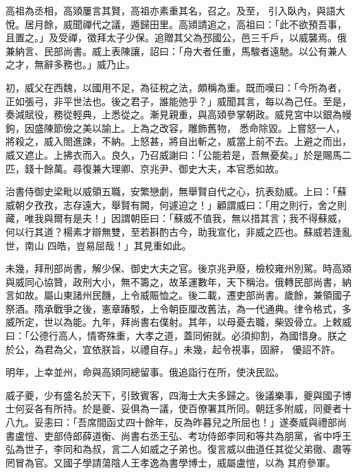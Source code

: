 \begin{pinyinscope}
 高祖為丞相，高熲屢言其賢，高祖亦素重其名，召之。及至，
 引入臥內，與語大悅。居月餘，威聞禪代之議，遁歸田里。高熲請追之，高祖曰：「此不欲預吾事，且置之。」及受禪，徵拜太子少保。追贈其父為邳國公，邑三千戶，以威襲焉。俄兼納言、民部尚書。威上表陳讓，詔曰：「舟大者任重，馬駿者遠馳。以公有兼人之才，無辭多務也。」威乃止。



 初，威父在西魏，以國用不足，為征稅之法，頗稱為重。既而嘆曰：「今所為者，正如張弓，非平世法也。後之君子，誰能弛乎？」威聞其言，每以為己任。至是，奏減賦役，務從輕典，上悉從之。漸見親重，與高熲參掌朝政。威見宮中以銀為幔鉤，因盛陳節儉之美以諭上。上為之改容，雕飾舊物，
 悉命除毀。上嘗怒一人，將殺之，威入閤進諫，不納。上怒甚，將自出斬之，威當上前不去。上避之而出，威又遮止。上拂衣而入。良久，乃召威謝曰：「公能若是，吾無憂矣。」於是賜馬二匹，錢十餘萬。尋復兼大理卿、京兆尹、御史大夫，本官悉如故。



 治書侍御史梁毗以威領五職，安繁戀劇，無舉賢自代之心，抗表劾威。上曰：「蘇威朝夕孜孜，志存遠大，舉賢有闕，何遽迫之！」顧謂威曰：「用之則行，舍之則藏，唯我與爾有是夫！」因謂朝臣曰：「蘇威不值我，無以措其言；我不得蘇威，何以行其道？楊素才辯無雙，至若斟酌古今，助我宣化，非威之匹也。蘇威若逢亂世，南山
 四皓，豈易屈哉！」其見重如此。



 未幾，拜刑部尚書，解少保、御史大夫之官。後京兆尹廢，檢校雍州別駕。時高熲與威同心協贊，政刑大小，無不籌之，故革運數年，天下稱治。俄轉民部尚書，納言如故。屬山東諸州民饑，上令威賑恤之。後二載，遷吏部尚書。歲餘，兼領國子祭酒。隋承戰爭之後，憲章踳駁，上令朝臣厘改舊法，為一代通典。律令格式，多威所定，世以為能。九年，拜尚書右僕射。其年，以母憂去職，柴毀骨立。上敕威曰：「公德行高人，情寄殊重，大孝之道，蓋同俯就。必須抑割，為國惜身。朕之於公，為君為父，宜依朕旨，以禮自存。」未幾，起令視事，固辭，
 優詔不許。



 明年，上幸並州，命與高熲同總留事。俄追詣行在所，使決民訟。



 威子夔，少有盛名於天下，引致賓客，四海士大夫多歸之。後議樂事，夔與國子博士何妥各有所持。於是夔、妥俱為一議，使百僚署其所同。朝廷多附威，同夔者十八九。妥恚曰：「吾席間函丈四十餘年，反為昨暮兒之所屈也！」遂奏威與禮部尚書盧愷、吏部侍郎薛道衡、尚書右丞王弘、考功侍郎李同和等共為朋黨，省中呼王弘為世子，李同和為叔，言二人如威之子弟也。復言威以曲道任其從父弟徹、肅等罔冒為官。又國子學請蕩陰人王孝逸為書學博士，威屬盧愷，以為
 其府參軍。




\end{pinyinscope}
